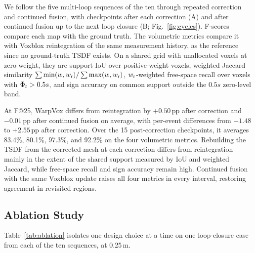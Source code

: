 We follow the five multi-loop sequences of the ten through repeated
correction and continued fusion, with checkpoints after each correction (A) and after
continued fusion up to the next loop closure (B; Fig.~\ref{fig:cycles}).
F-scores compare each map with the ground truth. The volumetric metrics
compare it with Voxblox reintegration of the same measurement history, as the
reference since no ground-truth TSDF exists. On a shared grid with
unallocated voxels at zero weight, they are support IoU over positive-weight
voxels, weighted Jaccard similarity $\sum\min(w,w_{\rm r})/\sum\max(w,w_{\rm r})$,
$w_{\rm r}$-weighted free-space recall over voxels with
${\Phi_{\rm r}>0.5s}$, and sign accuracy on common support outside the
$0.5s$ zero-level band.

At F@25, WarpVox differs from reintegration by $+0.50$\,pp after correction
and $-0.01$\,pp after continued fusion on average, with per-event differences
from $-1.48$ to $+2.55$\,pp after correction. Over the 15 post-correction
checkpoints, it averages 83.4\%, 80.1\%, 97.3\%, and 92.2\% on the four
volumetric metrics. Rebuilding the TSDF from the corrected mesh at each
correction differs from reintegration mainly in the extent of the shared
support measured by IoU and weighted Jaccard, while free-space recall and sign
accuracy remain high.
Continued fusion with the same Voxblox update raises all four metrics in
every interval, restoring agreement in revisited regions.

\subsection{Ablation Study}
Table~\ref{tab:ablation} isolates one design choice at a time on one
loop-closure case from each of the ten sequences, at 0.25\,m.

